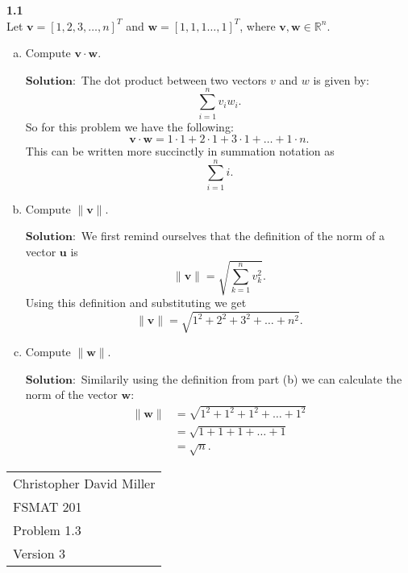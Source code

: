 \documentclass[12pt]{article}
\begin{document}
    \vspace{20pt}  %
    
    
    \textbf{1.1} \\  
    
        Let $\mathbf{v} = [1,2,3,\dots ,n]^T$ and $\mathbf{w} = [1,1,1\dots,1]^T$, where $\mathbf{v},\mathbf{w} \in \mathbb{R}^n$.
    
    
    \begin{enumerate}[(a)]
        \item Compute $\mathbf{v} \cdot \mathbf{w}$.
        
            $\textbf{Solution}:$ The dot product between two vectors $v$ and $w$ is given by:\[
              \sum_{i=1}^n v_iw_i  
            .\]
            So for this problem we have the following:
            \[
            \mathbf{v} \cdot \mathbf{w} = 1\cdot1 + 2 \cdot 1 + 3 \cdot 1 + \dots + 1 \cdot n
            .\]
            This can be written more succinctly in summation notation as
            \[
            \sum_{i=1}^n i
            .\]
        \item Compute $\|\mathbf{v}\|$.        
        
            $\textbf{Solution}:$ We first remind ourselves that the definition of the norm of a vector $\mathbf{u}$ is \[
                \|  \mathbf{v} \| = \sqrt{\sum_{k=1}^{n}v_k^2}
            .\]
            Using this definition and substituting we get\[
                \|  \mathbf{v} \| = \sqrt{1^2 + 2^2 + 3^2 + \dots +n^2}
            .\]
        \item Compute $\|\mathbf{w}\|$.
                
        $\textbf{Solution}:$ Similarily using the definition from part (b) we can calculate the norm of the vector $\mathbf{w}$:
        \begin{align*}
            \|  \mathbf{w} \|& = \sqrt{1^2 + 1^2 + 1^2 + \dots +1^2}\\
            & = \sqrt{1 + 1 + 1 + \dots +1}\\
            & = \sqrt{n}
        .\end{align*}
       
    \end{enumerate}

\newpage
\begin{flushright}
    \begin{tabular}{l}
    Christopher David Miller \\  %
    FSMAT 201 \\  %
    Problem 1.3 \\  %
    Version 3 \\ %
    \end{tabular}
    \end{flushright}
    \vspace{20pt}  %
    
\end{document}
